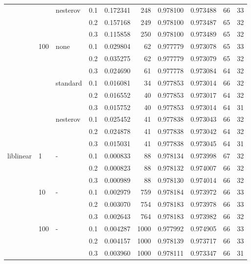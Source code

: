 \begin{table}[H]
\begin{tabular}{llllrrrrrr}
          &     & nesterov & 0.1 &  0.172341 &     248 &  0.978100 &  0.973488 &          66 &        33 \\
          &     &   & 0.2 &  0.157168 &     249 &  0.978100 &  0.973487 &          65 &        32 \\
          &     &   & 0.3 &  0.115858 &     250 &  0.978100 &  0.973489 &          65 &        32 \\
          & 100 & none & 0.1 &  0.029804 &      62 &  0.977779 &  0.973078 &          65 &        33 \\
          &     &   & 0.2 &  0.035275 &      62 &  0.977779 &  0.973079 &          65 &        32 \\
          &     &   & 0.3 &  0.024690 &      61 &  0.977778 &  0.973084 &          64 &        32 \\
          &     & standard & 0.1 &  0.016081 &      34 &  0.977853 &  0.973014 &          66 &        32 \\
          &     &   & 0.2 &  0.016552 &      40 &  0.977853 &  0.973017 &          64 &        32 \\
          &     &   & 0.3 &  0.015752 &      40 &  0.977853 &  0.973014 &          64 &        31 \\
          &     & nesterov & 0.1 &  0.025452 &      41 &  0.977838 &  0.973043 &          66 &        32 \\
          &     &   & 0.2 &  0.024878 &      41 &  0.977838 &  0.973042 &          64 &        32 \\
          &     &   & 0.3 &  0.015031 &      41 &  0.977838 &  0.973045 &          64 &        31 \\
liblinear & 1   & - & 0.1 &  0.000833 &      88 &  0.978134 &  0.973998 &          67 &        32 \\
          &     &   & 0.2 &  0.000823 &      88 &  0.978132 &  0.974007 &          66 &        32 \\
          &     &   & 0.3 &  0.000989 &      88 &  0.978130 &  0.974014 &          66 &        32 \\
          & 10  & - & 0.1 &  0.002979 &     759 &  0.978184 &  0.973972 &          66 &        33 \\
          &     &   & 0.2 &  0.003070 &     754 &  0.978183 &  0.973978 &          66 &        33 \\
          &     &   & 0.3 &  0.002643 &     764 &  0.978183 &  0.973982 &          66 &        32 \\
          & 100 & - & 0.1 &  0.004287 &    1000 &  0.977992 &  0.974905 &          66 &        33 \\
          &     &   & 0.2 &  0.004157 &    1000 &  0.978139 &  0.973717 &          66 &        33 \\
          &     &   & 0.3 &  0.003960 &    1000 &  0.978111 &  0.973347 &          66 &        31 \\
\bottomrule
\end{tabular}
\end{table}
